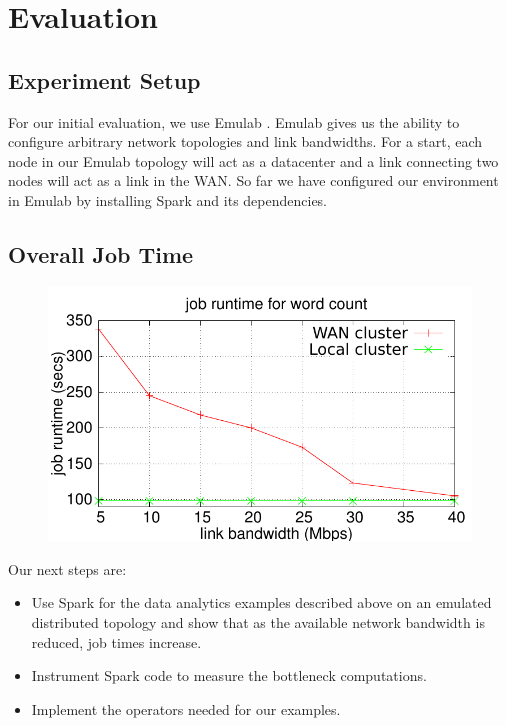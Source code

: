 \section{Evaluation}

\subsection{Experiment Setup}
For our initial evaluation, we use Emulab \cite{2}. Emulab gives us the ability to configure arbitrary network topologies and link bandwidths. For a start, each node in our Emulab topology will act as a datacenter and a link connecting two nodes will act as a link in the WAN. So far we have configured our environment in Emulab by installing Spark and its dependencies.

\subsection{Overall Job Time}

\begin{figure}[tb]
\centering\includegraphics[width=\columnwidth]{figs/job-time.pdf}
\vspace{-1.2em}
\caption{}
\label{job-time}
\vspace{.7em}
\end{figure}


Our next steps are:
\begin{itemize}
\item Use Spark for the data analytics examples described above on an emulated distributed topology and show that as the available network bandwidth is reduced, job times increase.
\item Instrument Spark code to measure the bottleneck computations.
\item Implement the operators needed for our examples.
\end{itemize}


